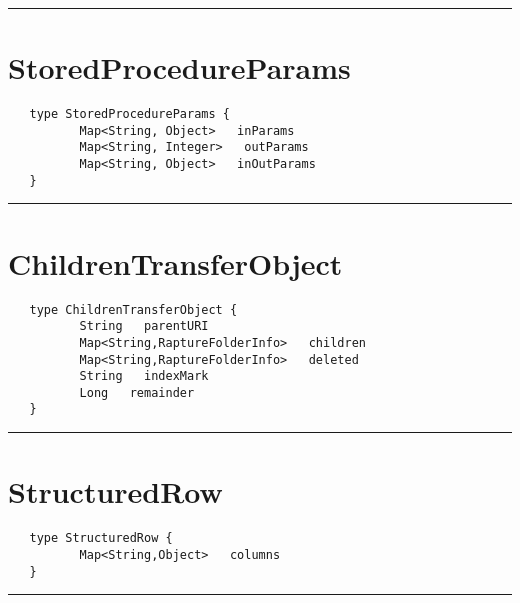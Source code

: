 \rule{15cm}{2pt}
\section{StoredProcedureParams}
\label{type:StoredProcedureParams}

\begin{verbatim}
   type StoredProcedureParams {
          Map<String, Object>   inParams
          Map<String, Integer>   outParams
          Map<String, Object>   inOutParams
   }
\end{verbatim}

\rule{15cm}{2pt}
\section{ChildrenTransferObject}
\label{type:ChildrenTransferObject}

\begin{verbatim}
   type ChildrenTransferObject {
          String   parentURI
          Map<String,RaptureFolderInfo>   children
          Map<String,RaptureFolderInfo>   deleted
          String   indexMark
          Long   remainder
   }
\end{verbatim}

\rule{15cm}{2pt}
\section{StructuredRow}
\label{type:StructuredRow}

\begin{verbatim}
   type StructuredRow {
          Map<String,Object>   columns
   }
\end{verbatim}

\rule{15cm}{2pt}
